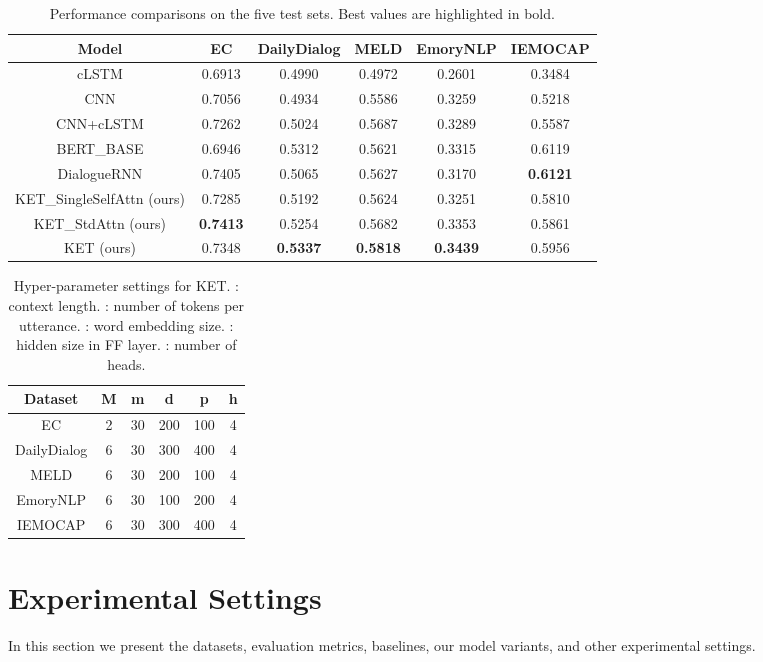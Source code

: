 \documentclass[11pt,a4paper]{article}
\begin{document}
\begin{table*}[!t]
\small
\centering
\begin{tabular}{cccccc}
 \hline
 \textbf{Model} & \textbf{EC} & \textbf{DailyDialog} & \textbf{MELD} & \textbf{EmoryNLP} & \textbf{IEMOCAP}\\
 \hline
 cLSTM & 0.6913 & 0.4990 & 0.4972 & 0.2601 & 0.3484\\
 CNN \cite{kim2014convolutional} & 0.7056 & 0.4934 & 0.5586 & 0.3259 & 0.5218\\
 CNN+cLSTM \cite{poria2017context} & 0.7262 & 0.5024 & 0.5687 & 0.3289 & 0.5587\\
BERT\_BASE \cite{devlin2018bert} & 0.6946 & 0.5312 & 0.5621 & 0.3315 & 0.6119\\
 DialogueRNN \cite{majumder2018dialoguernn} & 0.7405 & 0.5065 & 0.5627 & 0.3170 & \textbf{0.6121}\\
 \hline
 KET\_SingleSelfAttn (ours) & 0.7285 & 0.5192 & 0.5624 & 0.3251 & 0.5810\\
 KET\_StdAttn (ours) & \textbf{0.7413} & 0.5254 & 0.5682 & 0.3353 & 0.5861\\
 KET (ours) & 0.7348 & \textbf{0.5337} & \textbf{0.5818} & \textbf{0.3439} & 0.5956\\
 \hline
\end{tabular}
\caption{Performance comparisons on the five test sets. Best values are highlighted in bold.}
\label{table: performance comparisons}
\end{table*}

\begin{table}[!t]
\small
\centering
\begin{tabular}{cccccc}
 \hline
 \textbf{Dataset} & \textbf{M}& \textbf{m} & \textbf{d}& \textbf{p}& \textbf{h}\\
 \hline
 EC & 2& 30 & 200 & 100 & 4\\
 DailyDialog & 6& 30 & 300 & 400 & 4\\
 MELD & 6& 30 & 200 & 100 & 4\\
 EmoryNLP & 6& 30 & 100 & 200 & 4\\
 IEMOCAP & 6& 30 & 300 & 400 & 4\\
 \hline
\end{tabular}
\caption{Hyper-parameter settings for KET. : context length. : number of tokens per utterance. : word embedding size. : hidden size in FF layer. : number of heads.}
\label{table: hyper-parameters}
\end{table}
\section{Experimental Settings}
\label{experiments}
In this section we present the datasets, evaluation metrics, baselines, our model variants, and other experimental settings.
\end{document}
